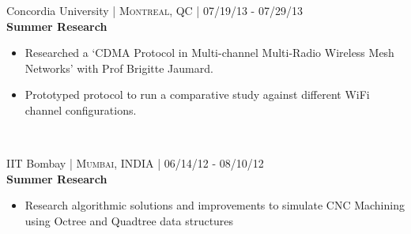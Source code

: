 \documentclass[10pt]{article} %
\begin{document}
{\begin{minipage}[t]{0.57\textwidth}


{\raggedright\large Concordia University \normalsize\textsc{ | Montreal, QC | 07/19/13 - 07/29/13}\\
\textbf{Summer Research}\\[5pt]}
\begin{itemize}\itemsep-0.25em
    \item Researched a ‘CDMA Protocol in Multi-channel Multi-Radio Wireless Mesh Networks’ with Prof Brigitte Jaumard.
    \item Prototyped protocol to run a comparative study against different WiFi channel configurations.
\end{itemize}\\



{\raggedright\large IIT Bombay \normalsize\textsc{ | Mumbai, INDIA | 06/14/12 - 08/10/12}\\
\textbf{Summer Research}\\[5pt]}
\begin{itemize}\itemsep-0.25em
    \item Research algorithmic solutions and improvements  to simulate CNC Machining using Octree and Quadtree data structures
\end{itemize}\\


\end{minipage} %
\hfill
\begin{minipage}[t]{0.4\textwidth} %
\vspace{0pt} %



\end{minipage}}
\end{document}
